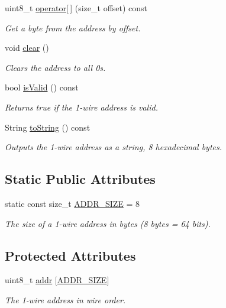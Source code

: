 \begin{DoxyCompactItemize}
uint8\+\_\+t \mbox{\hyperlink{class_d_s24821_wire_address_a67beb121b96c0f236a57f144b6a8a183}{operator\mbox{[}$\,$\mbox{]}}} (size\+\_\+t offset) const
\begin{DoxyCompactList}\small\item\em Get a byte from the address by offset. \end{DoxyCompactList}\item 
void \mbox{\hyperlink{class_d_s24821_wire_address_ae42958bfdb76f2dbeba7e6b27f41cafa}{clear}} ()
\begin{DoxyCompactList}\small\item\em Clears the address to all 0s. \end{DoxyCompactList}\item 
bool \mbox{\hyperlink{class_d_s24821_wire_address_a1e9409166280dc3a78011698d3c98bc5}{is\+Valid}} () const
\begin{DoxyCompactList}\small\item\em Returns true if the 1-\/wire address is valid. \end{DoxyCompactList}\item 
String \mbox{\hyperlink{class_d_s24821_wire_address_a3a2dada65da76880cf47df392273a093}{to\+String}} () const
\begin{DoxyCompactList}\small\item\em Outputs the 1-\/wire address as a string, 8 hexadecimal bytes. \end{DoxyCompactList}\end{DoxyCompactItemize}
\subsection*{Static Public Attributes}
\begin{DoxyCompactItemize}
\item 
\mbox{\label{class_d_s24821_wire_address_a49a60d299efb0f3c17f55f3dededfcdc}} 
static const size\+\_\+t \mbox{\hyperlink{class_d_s24821_wire_address_a49a60d299efb0f3c17f55f3dededfcdc}{A\+D\+D\+R\+\_\+\+S\+I\+ZE}} = 8
\begin{DoxyCompactList}\small\item\em The size of a 1-\/wire address in bytes (8 bytes = 64 bits). \end{DoxyCompactList}\end{DoxyCompactItemize}
\subsection*{Protected Attributes}
\begin{DoxyCompactItemize}
\item 
uint8\+\_\+t \mbox{\hyperlink{class_d_s24821_wire_address_af08b86e9765fd101648f0410cfa77378}{addr}} \mbox{[}\mbox{\hyperlink{class_d_s24821_wire_address_a49a60d299efb0f3c17f55f3dededfcdc}{A\+D\+D\+R\+\_\+\+S\+I\+ZE}}\mbox{]}
\begin{DoxyCompactList}\small\item\em The 1-\/wire address in wire order. \end{DoxyCompactList}\end{DoxyCompactItemize}


